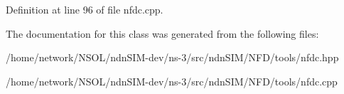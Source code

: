 Definition at line 96 of file nfdc.\+cpp.



The documentation for this class was generated from the following files\+:\begin{DoxyCompactItemize}
\item 
/home/network/\+N\+S\+O\+L/ndn\+S\+I\+M-\/dev/ns-\/3/src/ndn\+S\+I\+M/\+N\+F\+D/tools/nfdc.\+hpp\item 
/home/network/\+N\+S\+O\+L/ndn\+S\+I\+M-\/dev/ns-\/3/src/ndn\+S\+I\+M/\+N\+F\+D/tools/nfdc.\+cpp\end{DoxyCompactItemize}
